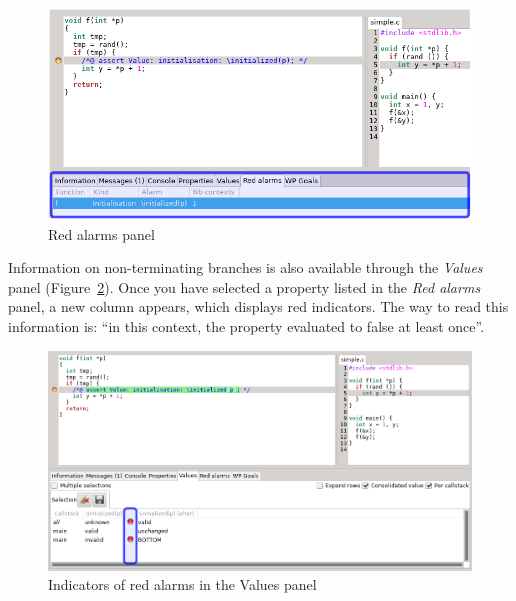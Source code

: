 \begin{figure}[htbp]
\centering
\includegraphics[width=\textwidth]{gui-images/gui-red-alarms-panel.png}
\caption{Red alarms panel}
\label{fig:red-alarms-panel}
\end{figure}

Information on non-terminating branches is also available through
the \emph{Values} panel (Figure~\ref{fig:red-values}). Once you have selected
a property listed in the \emph{Red alarms} panel, a new column appears,
which displays red indicators.
The way to read this information is: ``in this context,
the property evaluated to false at least once''.

\begin{figure}[htbp]
\centering
\includegraphics[width=\textwidth]{gui-images/gui-red-values.png}
\caption{Indicators of red alarms in the Values panel}
\label{fig:red-values}
\end{figure}



